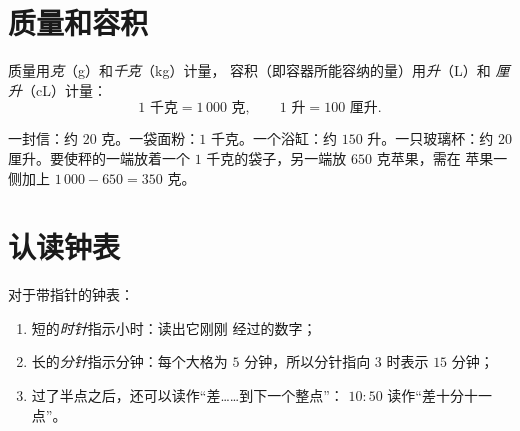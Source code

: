 \section{质量和容积}

\begin{definition}[质量和容积的单位]\label{def:g3:measure:mass}
质量用\emph{克}（g）和\emph{千克}（kg）计量，
容积（即容器所能容纳的量）用\emph{升}（L）和
\emph{厘升}（cL）计量：
\[
1 \text{ 千克} = 1\,000 \text{ 克},
\qquad
1 \text{ 升} = 100 \text{ 厘升}.
\]
\end{definition}

\begin{example}\label{ex:g3:measure:mass}
一封信：约 $20$ 克。一袋面粉：$1$ 千克。一个浴缸：约
$150$ 升。一只玻璃杯：约 $20$ 厘升。要使秤的一端放着一个
$1$ 千克的袋子，另一端放 $650$ 克苹果，需在
苹果一侧加上 $1\,000 - 650 = 350$ 克。
\end{example}

\section{认读钟表}

\begin{method}[读时间]\label{met:g3:measure:clock}
对于带指针的钟表：
\begin{enumerate}
  \item 短的\emph{时针}指示小时：读出它刚刚
        经过的数字；
  \item 长的\emph{分针}指示分钟：每个大格为 $5$
        分钟，所以分针指向 $3$ 时表示 $15$ 分钟；
  \item 过了半点之后，还可以读作“差……到下一个整点”：
        $10{:}50$ 读作“差十分十一点”。
\end{enumerate}
\end{method}

